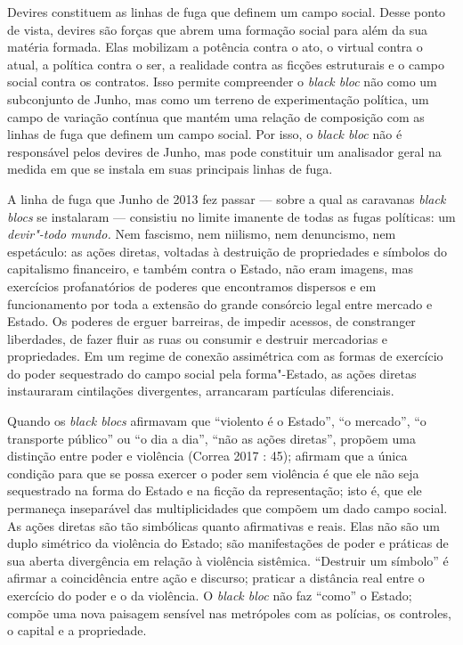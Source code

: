 Devires constituem as linhas de fuga que definem um campo social. Desse
ponto de vista, devires são forças que abrem uma formação social para
além da sua matéria formada. Elas mobilizam a potência contra o ato, o
virtual contra o atual, a política contra o ser, a realidade contra as
ficções estruturais e o campo social contra os contratos. Isso permite
compreender o \emph{black bloc }não como um subconjunto de Junho, mas
como um terreno de experimentação política, um campo de variação
contínua que mantém uma relação de composição com as linhas de fuga que
definem um campo social. Por isso, o \emph{black bloc }não é responsável
pelos devires de Junho, mas pode constituir um analisador geral na
medida em que se instala em suas principais linhas de fuga.

A linha de fuga que Junho de 2013 fez passar --- sobre a qual as
caravanas \emph{black blocs} se instalaram --- consistiu no limite
imanente de todas as fugas políticas: um \emph{devir"-todo mundo.} Nem
fascismo, nem niilismo, nem denuncismo, nem espetáculo: as ações
diretas, voltadas à destruição de propriedades e símbolos do capitalismo
financeiro, e também contra o Estado, não eram imagens, mas exercícios
profanatórios de poderes que encontramos dispersos e em funcionamento
por toda a extensão do grande consórcio legal entre mercado e Estado. Os
poderes de erguer barreiras, de impedir acessos, de constranger
liberdades, de fazer fluir as ruas ou consumir e destruir mercadorias e
propriedades. Em um regime de conexão assimétrica com as formas de
exercício do poder sequestrado do campo social pela forma"-Estado, as
ações diretas instauraram cintilações divergentes, arrancaram partículas
diferenciais.

Quando os \emph{black blocs} afirmavam que ``violento é o Estado'', ``o
mercado'', ``o transporte público'' ou ``o dia a dia'', ``não as ações
diretas'', propõem uma distinção entre poder e violência (Correa 2017 :
45); afirmam que a única condição para que se possa exercer o poder sem
violência é que ele não seja sequestrado na forma do Estado e na ficção
da representação; isto é, que ele permaneça inseparável das
multiplicidades que compõem um dado campo social. As ações diretas são
tão simbólicas quanto afirmativas e reais. Elas não são um duplo
simétrico da violência do Estado; são manifestações de poder e práticas
de sua aberta divergência em relação à violência sistêmica. ``Destruir
um símbolo'' é afirmar a coincidência entre ação e discurso; praticar a
distância real entre o exercício do poder e o da violência. O
\emph{black bloc} não faz ``como'' o Estado; compõe uma nova paisagem
sensível nas metrópoles com as polícias, os controles, o capital e a
propriedade.

